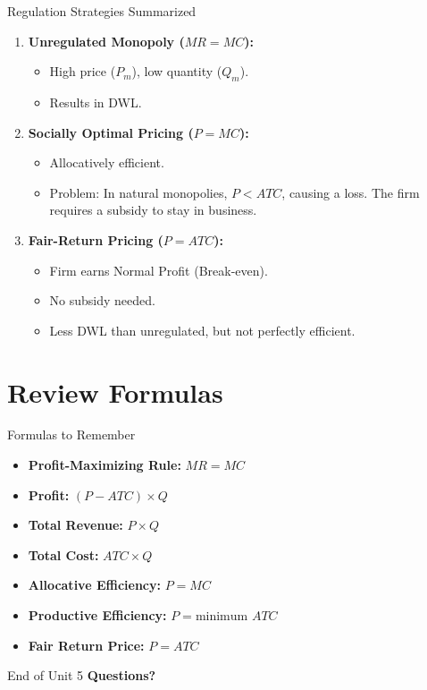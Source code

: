 \documentclass[aspectratio=169, 10pt]{beamer}
\begin{document}
\begin{frame}{Regulation Strategies Summarized}
    \begin{enumerate}
        \item \textbf{Unregulated Monopoly ($MR = MC$):}
        \begin{itemize}
            \item High price ($P_m$), low quantity ($Q_m$).
            \item Results in DWL.
        \end{itemize}
        
        \item \textbf{Socially Optimal Pricing ($P = MC$):}
        \begin{itemize}
            \item Allocatively efficient.
            \item Problem: In natural monopolies, $P < ATC$, causing a loss. The firm requires a subsidy to stay in business.
        \end{itemize}
        
        \item \textbf{Fair-Return Pricing ($P = ATC$):}
        \begin{itemize}
            \item Firm earns Normal Profit (Break-even).
            \item No subsidy needed.
            \item Less DWL than unregulated, but not perfectly efficient.
        \end{itemize}
    \end{enumerate}
\end{frame}

\section{Review Formulas}

\begin{frame}{Formulas to Remember}
    \begin{itemize}
        \item \textbf{Profit-Maximizing Rule:} $MR = MC$
        \item \textbf{Profit:} $(P - ATC) \times Q$
        \item \textbf{Total Revenue:} $P \times Q$
        \item \textbf{Total Cost:} $ATC \times Q$
        \item \textbf{Allocative Efficiency:} $P = MC$
        \item \textbf{Productive Efficiency:} $P = \text{minimum } ATC$
        \item \textbf{Fair Return Price:} $P = ATC$
    \end{itemize}
\end{frame}

\begin{frame}{End of Unit 5}
    \centering
    \Huge \textbf{Questions?}
\end{frame}
\end{document}
